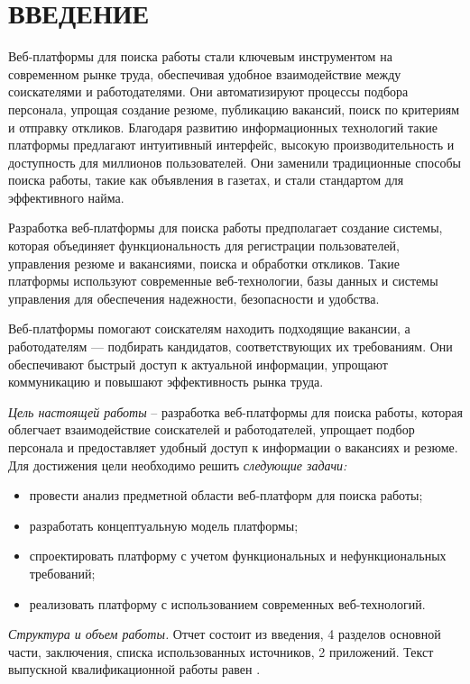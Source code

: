 \section*{ВВЕДЕНИЕ}

Веб-платформы для поиска работы стали ключевым инструментом на современном рынке труда, обеспечивая удобное взаимодействие между соискателями и работодателями. Они автоматизируют процессы подбора персонала, упрощая создание резюме, публикацию вакансий, поиск по критериям и отправку откликов. Благодаря развитию информационных технологий такие платформы предлагают интуитивный интерфейс, высокую производительность и доступность для миллионов пользователей. Они заменили традиционные способы поиска работы, такие как объявления в газетах, и стали стандартом для эффективного найма.

Разработка веб-платформы для поиска работы предполагает создание системы, которая объединяет функциональность для регистрации пользователей, управления резюме и вакансиями, поиска и обработки откликов. Такие платформы используют современные веб-технологии, базы данных и системы управления для обеспечения надежности, безопасности и удобства.

Веб-платформы помогают соискателям находить подходящие вакансии, а работодателям — подбирать кандидатов, соответствующих их требованиям. Они обеспечивают быстрый доступ к актуальной информации, упрощают коммуникацию и повышают эффективность рынка труда.

\emph{Цель настоящей работы} – разработка веб-платформы для поиска работы, которая облегчает взаимодействие соискателей и работодателей, упрощает подбор персонала и предоставляет удобный доступ к информации о вакансиях и резюме. Для достижения цели необходимо решить \emph{следующие задачи:}
\begin{itemize}
\item провести анализ предметной области веб-платформ для поиска работы;
\item разработать концептуальную модель платформы;
\item спроектировать платформу с учетом функциональных и нефункциональных требований;
\item реализовать платформу с использованием современных веб-технологий.
\end{itemize}

\emph{Структура и объем работы.} Отчет состоит из введения, 4 разделов основной части, заключения, списка использованных источников, 2 приложений. Текст выпускной квалификационной работы равен .

